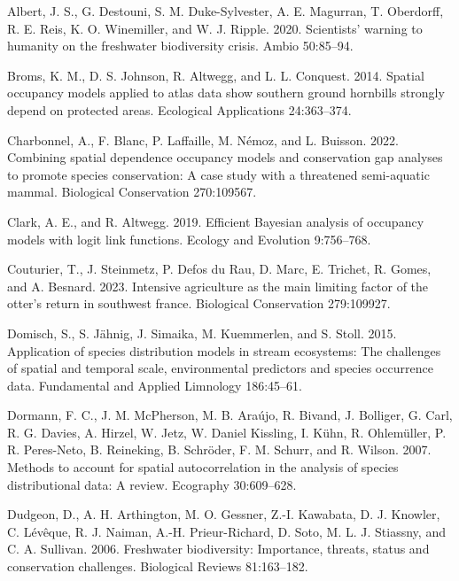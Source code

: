 \documentclass[
  11pt,
  a4paper,
]{article}
\newlength{\cslhangindent}
\newenvironment{CSLReferences}[2] %
 {\begin{list}{}{%
  \setlength{\itemindent}{0pt}
  \setlength{\leftmargin}{0pt}
  \setlength{\parsep}{0pt}
  \ifodd #1
   \setlength{\leftmargin}{\cslhangindent}
   \setlength{\itemindent}{-1\cslhangindent}
  \fi
  \setlength{\itemsep}{#2\baselineskip}}}
 {\end{list}}
\begin{document}
\label{refs}
\begin{CSLReferences}{1}{0}
Albert, J. S., G. Destouni, S. M. Duke-Sylvester, A. E. Magurran, T. Oberdorff, R. E. Reis, K. O. Winemiller, and W. J. Ripple. 2020. Scientists' warning to humanity on the freshwater biodiversity crisis. Ambio 50:85--94.

Broms, K. M., D. S. Johnson, R. Altwegg, and L. L. Conquest. 2014. Spatial occupancy models applied to atlas data show southern ground hornbills strongly depend on protected areas. Ecological Applications 24:363--374.

Charbonnel, A., F. Blanc, P. Laffaille, M. Némoz, and L. Buisson. 2022. Combining spatial dependence occupancy models and conservation gap analyses to promote species conservation: A case study with a threatened semi-aquatic mammal. Biological Conservation 270:109567.

Clark, A. E., and R. Altwegg. 2019. Efficient {B}ayesian analysis of occupancy models with logit link functions. Ecology and Evolution 9:756--768.

Couturier, T., J. Steinmetz, P. Defos du Rau, D. Marc, E. Trichet, R. Gomes, and A. Besnard. 2023. Intensive agriculture as the main limiting factor of the otter's return in southwest france. Biological Conservation 279:109927.

Domisch, S., S. Jähnig, J. Simaika, M. Kuemmerlen, and S. Stoll. 2015. Application of species distribution models in stream ecosystems: The challenges of spatial and temporal scale, environmental predictors and species occurrence data. Fundamental and Applied Limnology 186:45--61.

Dormann, F. C., J. M. McPherson, M. B. Araújo, R. Bivand, J. Bolliger, G. Carl, R. G. Davies, A. Hirzel, W. Jetz, W. Daniel Kissling, I. Kühn, R. Ohlemüller, P. R. Peres-Neto, B. Reineking, B. Schröder, F. M. Schurr, and R. Wilson. 2007. Methods to account for spatial autocorrelation in the analysis of species distributional data: A review. Ecography 30:609--628.

Dudgeon, D., A. H. Arthington, M. O. Gessner, Z.-I. Kawabata, D. J. Knowler, C. Lévêque, R. J. Naiman, A.-H. Prieur-Richard, D. Soto, M. L. J. Stiassny, and C. A. Sullivan. 2006. Freshwater biodiversity: Importance, threats, status and conservation challenges. Biological Reviews 81:163--182.


\end{CSLReferences}
\end{document}
